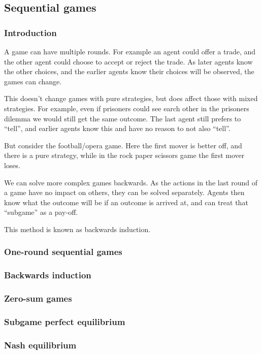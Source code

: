 \subsection{Sequential games}

\subsubsection{Introduction}

A game can have multiple rounds. For example an agent could offer a trade, and the other agent could choose to accept or reject the trade. As later agents know the other choices, and the earlier agents know their choices will be observed, the games can change.

This doesn’t change games with pure strategies, but does affect those with mixed strategies. For example, even if prisoners could see earch other in the prisoners dilemma we would still get the same outcome. The last agent still prefers to “tell”, and earlier agents know this and have no reason to not also “tell”.

But consider the football/opera game. Here the first mover is better off, and there is a pure strategy, while in the rock paper scissors game the first mover loses.

We can solve more complex games backwards. As the actions in the last round of a game have no impact on others, they can be solved separately. Agents then know what the outcome will be if an outcome is arrived at, and can treat that “subgame” as a pay-off.

This method is known as backwards induction.


\subsubsection{One-round sequential games}


\subsubsection{Backwards induction}


\subsubsection{Zero-sum games}


\subsubsection{Subgame perfect equilibrium}


\subsubsection{Nash equilibrium}

